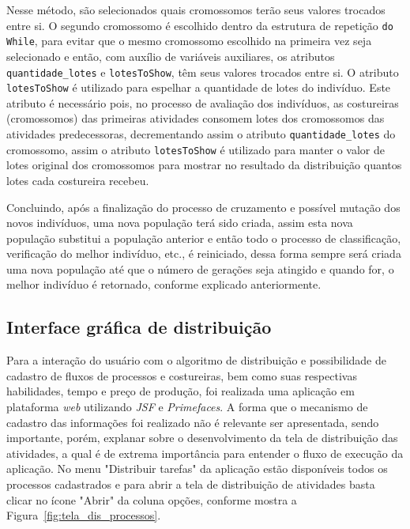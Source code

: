 \par Nesse método, são selecionados quais cromossomos terão seus valores trocados entre si. O segundo cromossomo é escolhido dentro da 
estrutura de repetição \texttt{do While}, para evitar que o mesmo cromossomo escolhido na primeira vez seja selecionado e então, com auxílio de variáveis auxiliares, os atributos \texttt{quantidade\_lotes} e \texttt{lotesToShow}, têm seus valores trocados entre si. O atributo \texttt{lotesToShow} é utilizado para espelhar a quantidade de lotes do indivíduo. Este atributo é necessário pois, no processo de avaliação dos indivíduos, as costureiras (cromossomos) das primeiras atividades consomem lotes dos cromossomos das atividades predecessoras, decrementando assim o atributo \texttt{quantidade\_lotes} do cromossomo, assim o atributo \texttt{lotesToShow} é utilizado para manter o valor de lotes original dos cromossomos para mostrar no resultado da distribuição quantos lotes cada costureira recebeu.

Concluindo, após a finalização do processo de cruzamento e possível mutação dos novos indivíduos, uma nova população terá sido criada, assim esta nova população substitui a população anterior e então todo o processo de classificação, verificação do melhor indivíduo, etc., é reiniciado, dessa forma sempre será criada uma nova população até que o número de gerações seja atingido e quando for, o melhor indivíduo 
é retornado, conforme explicado anteriormente. 

\subsection{Interface gráfica de distribuição} \label{interface_grafica_section}

\par Para a interação do usuário com o algoritmo de distribuição e possibilidade de cadastro de fluxos de processos e 
costureiras, bem como suas respectivas habilidades, tempo e preço de produção, foi realizada uma aplicação em plataforma \textit{web}
utilizando \textit{JSF} e \textit{Primefaces}. A forma que o mecanismo de cadastro das informações foi realizado não é relevante
ser apresentada, sendo importante, porém, explanar sobre o desenvolvimento da tela de distribuição das atividades, a qual é de extrema importância para entender o fluxo de execução da aplicação. No menu "Distribuir tarefas" da aplicação estão disponíveis todos os processos cadastrados e para abrir a tela de distribuição de atividades basta clicar no ícone "Abrir" da coluna opções, conforme mostra a Figura~\ref{fig:tela_dis_processos}.

